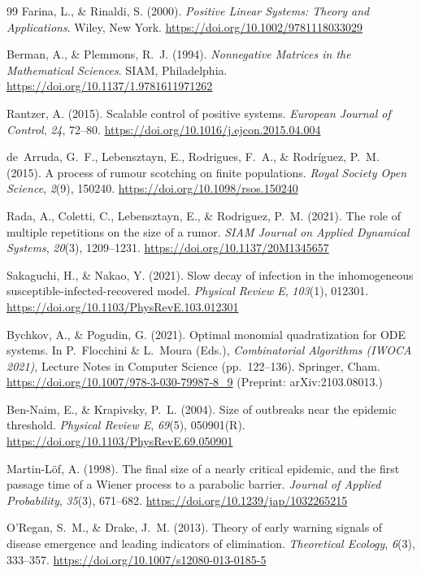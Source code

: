 \documentclass[11pt,a4paper]{article}
\theoremstyle{definition}\newtheorem{definition}[theorem]{Definition}
\theoremstyle{remark}\newtheorem{remark}[theorem]{Remark}
\begin{document}
\begin{thebibliography}{99}
Farina, L., \& Rinaldi, S. (2000).
\emph{Positive Linear Systems: Theory and Applications}.
Wiley, New York.
\url{https://doi.org/10.1002/9781118033029}

Berman, A., \& Plemmons, R.~J. (1994).
\emph{Nonnegative Matrices in the Mathematical Sciences}.
SIAM, Philadelphia.
\url{https://doi.org/10.1137/1.9781611971262}

Rantzer, A. (2015).
Scalable control of positive systems.
\emph{European Journal of Control}, \emph{24}, 72--80.
\url{https://doi.org/10.1016/j.ejcon.2015.04.004}

de~Arruda, G.~F., Lebensztayn, E., Rodrigues, F.~A., \& Rodr\'iguez, P.~M. (2015).
A process of rumour scotching on finite populations.
\emph{Royal Society Open Science}, \emph{2}(9), 150240.
\url{https://doi.org/10.1098/rsos.150240}

Rada, A., Coletti, C., Lebensztayn, E., \& Rodriguez, P.~M. (2021).
The role of multiple repetitions on the size of a rumor.
\emph{SIAM Journal on Applied Dynamical Systems}, \emph{20}(3), 1209--1231.
\url{https://doi.org/10.1137/20M1345657}

Sakaguchi, H., \& Nakao, Y. (2021).
Slow decay of infection in the inhomogeneous susceptible-infected-recovered model.
\emph{Physical Review E}, \emph{103}(1), 012301.
\url{https://doi.org/10.1103/PhysRevE.103.012301}

Bychkov, A., \& Pogudin, G. (2021).
Optimal monomial quadratization for ODE systems.
In P.~Flocchini \& L.~Moura (Eds.), \emph{Combinatorial Algorithms (IWOCA 2021)}, Lecture Notes in Computer Science (pp.~122--136). Springer, Cham.
\url{https://doi.org/10.1007/978-3-030-79987-8_9}
(Preprint: arXiv:2103.08013.)

Ben-Naim, E., \& Krapivsky, P.~L. (2004).
Size of outbreaks near the epidemic threshold.
\emph{Physical Review E}, \emph{69}(5), 050901(R).
\url{https://doi.org/10.1103/PhysRevE.69.050901}

Martin-L\"of, A. (1998).
The final size of a nearly critical epidemic, and the first passage time of a Wiener process to a parabolic barrier.
\emph{Journal of Applied Probability}, \emph{35}(3), 671--682.
\url{https://doi.org/10.1239/jap/1032265215}

O'Regan, S.~M., \& Drake, J.~M. (2013).
Theory of early warning signals of disease emergence and leading indicators of elimination.
\emph{Theoretical Ecology}, \emph{6}(3), 333--357.
\url{https://doi.org/10.1007/s12080-013-0185-5}


\end{thebibliography}
\end{document}
